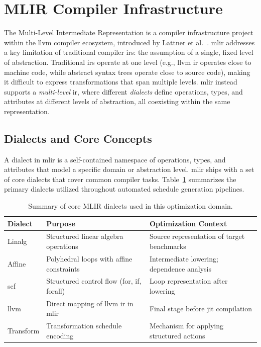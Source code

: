 \section{MLIR Compiler Infrastructure}

The Multi-Level Intermediate Representation is a compiler infrastructure project within the \gls{llvm} compiler ecosystem, introduced by Lattner et al.~\cite{lattner2021mlir}. \gls{mlir} addresses a key limitation of traditional compiler \gls{ir}s: the assumption of a single, fixed level of abstraction. Traditional \gls{ir}s operate at one level (e.g., \gls{llvm} \gls{ir} operates close to machine code, while abstract syntax trees operate close to source code), making it difficult to express transformations that span multiple levels. \gls{mlir} instead supports a \textit{multi-level} \gls{ir}, where different \textit{dialects} define operations, types, and attributes at different levels of abstraction, all coexisting within the same representation.

\subsection{Dialects and Core Concepts}

A dialect in \gls{mlir} is a self-contained namespace of operations, types, and attributes that model a specific domain or abstraction level. \gls{mlir} ships with a set of core dialects that cover common compiler tasks. Table~\ref{tab:mlir-dialects} summarizes the primary dialects utilized throughout automated schedule generation pipelines.

\begin{table}[H]
    \centering
    \caption{Summary of core MLIR dialects used in this optimization domain.}
    \label{tab:mlir-dialects}
    \vspace{0.2cm}
    \begin{tabularx}{\textwidth}{l >{\raggedright\arraybackslash}p{5cm} >{\raggedright\arraybackslash}p{10cm}}
    
        \toprule
        \textbf{Dialect} & \textbf{Purpose} & \textbf{Optimization Context} \\
        \midrule
        Linalg & Structured linear algebra operations & Source representation of target benchmarks \\
        \addlinespace
        Affine & Polyhedral loops with affine constraints & Intermediate lowering; dependence analysis \\
        \addlinespace
        \gls{scf} & Structured control flow (for, if, forall) & Loop representation after lowering \\
        \addlinespace
        \gls{llvm} & Direct mapping of \gls{llvm} \gls{ir} in \gls{mlir} & Final stage before \gls{jit} compilation \\
        \addlinespace
        Transform & Transformation schedule encoding & Mechanism for applying structured actions \\
        \bottomrule
    \end{tabularx}
\end{table}

